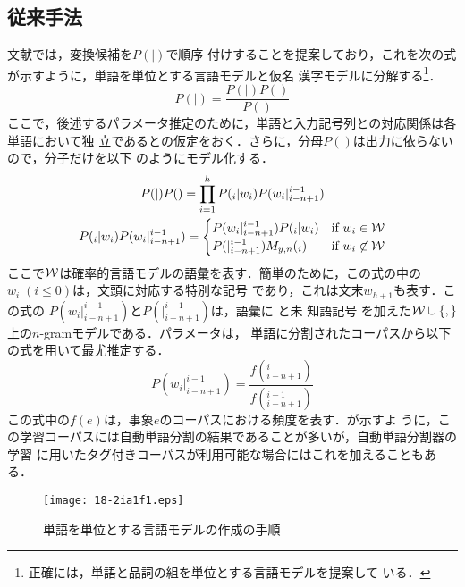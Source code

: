 \documentclass[japanese]{jnlp_JS2.0}
\def\BT{}
\def\UW{}
\def\Bdma#1{}
\def\figref#1{}
\def\Cite#1{}
\begin{document}
\subsection{従来手法}

文献\Cite{確率的モデルによる仮名漢字変換}では，変換候補を$P(\Bdma{w}|\Bdma{y})$で順序
付けすることを提案しており，これを次の式が示すように，単語を単位とする言語モデルと仮名
漢字モデルに分解する\footnote{正確には，単語と品詞の組を単位とする言語モデルを提案して
いる．}．
\begin{equation}
  \label{equation:M1}
  P(\Bdma{w}|\Bdma{y}) = \frac{P(\Bdma{y}|\Bdma{w})P(\Bdma{w})}{P(\Bdma{y})}
\end{equation}
ここで，後述するパラメータ推定のために，単語と入力記号列との対応関係は各単語において独
立であるとの仮定をおく．さらに，分母$P(\Bdma{y})$は出力に依らないので，分子だけを以下
のようにモデル化する．
\begin{gather}
 P(\Bdma{y}|\Bdma{w})P(\Bdma{w})
  = \prod_{i=1}^{h} P(\Bdma{y}_{i}|w_{i})P(w_{i}|\Bdma{w}_{i-n+1}^{i-1})
	\nonumber \\
 P(\Bdma{y}_{i}|w_{i})P(w_{i}|\Bdma{w}_{i-n+1}^{i-1})
  = \begin{cases}
   P(w_{i}|\Bdma{w}_{i-n+1}^{i-1})P(\Bdma{y}_{i}|w_{i}) &
	\text{if}\ w_{i} \in {\cal W} \\
   P(\UW|\Bdma{w}_{i-n+1}^{i-1})M_{y,n}(\Bdma{y}_{i}) &
    \text{if}\ w_{i} \not \in {\cal W} 
    \end{cases}
 \label{eqnarray:KKConv1}
\end{gather}
ここで${\cal W}$は確率的言語モデルの語彙を表す．簡単のために，この式の中の$w_{i}\;(i
\leq 0)$は，文頭に対応する特別な記号 \BT であり，これは文末$w_{h+1}$も表す．この式の
$P(w_{i}|\Bdma{w}_{i-n+1} ^{i-1})$と$P(\UW|\Bdma{w}_{i-n+1}^{i-1})$は，語彙に \BT と未
知語記号 \UW を加えた${\cal W}\cup\{\BT,\UW\}$上の$n$-gramモデルである．パラメータは，
単語に分割されたコーパスから以下の式を用いて最尤推定する．
\begin{equation}
  \label{equation:LM}
  P(w_{i}| \Bdma{w}_{i-n+1}^{i-1})
  = \frac{f(\Bdma{w}_{i-n+1}^{i})}{f(\Bdma{w}_{i-n+1}^{i-1})}
\end{equation}
この式中の$f(e)$は，事象$e$のコーパスにおける頻度を表す．\figref{figure:LMA}が示すよ
うに，この学習コーパスには自動単語分割の結果であることが多いが，自動単語分割器の学習
に用いたタグ付きコーパスが利用可能な場合にはこれを加えることもある．

\begin{figure}[tb]
  \begin{center}
  \texttt{[image: 18-2ia1f1.eps]}
  \end{center}
  \caption{単語を単位とする言語モデルの作成の手順}
  \label{figure:LMA}
\end{figure}
\end{document}
